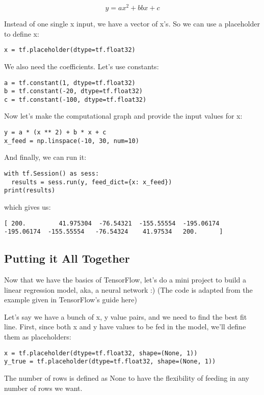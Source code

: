 \begin{equation}
y = ax^2+bbx+c
\end{equation}

Instead of one single x input, we have a vector of x's. So we can use a placeholder to define x:

\begin{lstlisting}
x = tf.placeholder(dtype=tf.float32)
\end{lstlisting}
We also need the coefficients. Let's use constants:

\begin{lstlisting}
a = tf.constant(1, dtype=tf.float32)
b = tf.constant(-20, dtype=tf.float32)
c = tf.constant(-100, dtype=tf.float32)
\end{lstlisting}
Now let's make the computational graph and provide the input values for x:

\begin{lstlisting}
y = a * (x ** 2) + b * x + c
x_feed = np.linspace(-10, 30, num=10)
\end{lstlisting}
And finally, we can run it:

\begin{lstlisting}
with tf.Session() as sess:
  results = sess.run(y, feed_dict={x: x_feed})
print(results)
\end{lstlisting}
which gives us:

\begin{lstlisting}
[ 200.         41.975304  -76.54321  -155.55554  -195.06174  -195.06174  -155.55554   -76.54324    41.97534   200.      ]
\end{lstlisting}
\subsection{Putting it All Together}

Now that we have the basics of TensorFlow, let's do a mini project to build a linear regression model, aka, a neural network :) (The code is adapted from the example given in TensorFlow's guide here)

Let's say we have a bunch of x, y value pairs, and we need to find the best fit line. First, since both x and y have values to be fed in the model, we'll define them as placeholders:

\begin{lstlisting}
x = tf.placeholder(dtype=tf.float32, shape=(None, 1))
y_true = tf.placeholder(dtype=tf.float32, shape=(None, 1))
\end{lstlisting}
The number of rows is defined as None to have the flexibility of feeding in any number of rows we want.

